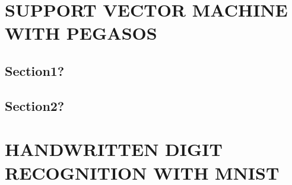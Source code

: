 \documentclass[10pt,twoside]{article}
\begin{document}

\section{\uppercase{Support Vector Machine with Pegasos}}

\subsection{Section1?}


\subsection{Section2?}



\section{\uppercase{Handwritten Digit Recognition with MNIST}}


\vfill
\end{document}
